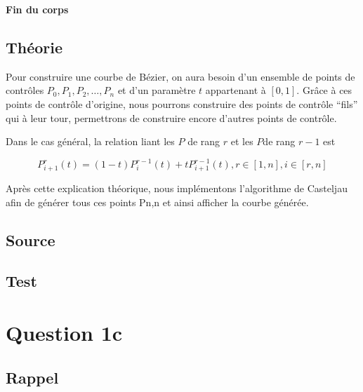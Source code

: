 \documentclass[a4paper,10pt]{report}
\begin{document}
\textbf{Fin du corps}

\subsection*{Théorie}

Pour construire une courbe de Bézier, on aura besoin d’un ensemble de points de contrôles $P_{0}, P_{1}, P_{2}, …, P_{n}$ et d’un paramètre $t$ appartenant à $[0,1]$. Grâce à ces points de contrôle d’origine, nous pourrons construire des points de contrôle “fils” qui à leur tour, permettrons de construire encore d’autres points de contrôle. 

Dans le cas général, la relation liant les $P$ de rang $r$ et les $P $de rang $r-1$ est 

\begin{equation}
    P^{r}_{i+1}(t) = (1-t)P^{r-1}_{i}(t)+tP^{r-1}_{i+1}(t), r \in [1, n], i \in [r, n]
\end{equation}

Après cette explication théorique, nous implémentons l’algorithme de Casteljau afin de générer tous ces points Pn,n et ainsi afficher la courbe générée.
    
\newpage
\subsection*{Source}

\begin{center}
	
\end{center}

\subsection*{Test}

\begin{center}
%	
\end{center}

\newpage
\section*{Question 1c}

\subsection*{Rappel}
\end{document}
